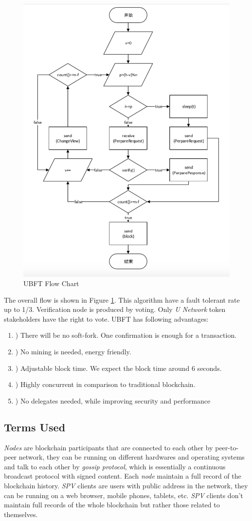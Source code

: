 \begin{figure}
\centering
\includegraphics[width= 0.7 \linewidth]{consensus.png}
\caption{UBFT Flow Chart}
\label{fig:ubft}
\end{figure}    
    
    The overall flow is shown in Figure \ref{fig:ubft}. This algorithm have a fault tolerant rate up to 1/3. Verification node is produced by voting. Only \emph{U Network} token stakeholders have the right to vote.  UBFT has following advantages:
\begin{enumerate}
    \item ) There will be no soft-fork. One confirmation is enough for a transaction. 
    \item ) No mining is needed, energy friendly.
    \item ) Adjustable block time. We expect the block time around 6 seconds. 
    \item ) Highly concurrent in comparison to traditional blockchain. 
    \item ) No delegates needed, while improving security and performance
\end{enumerate}



\subsection{Terms Used}
    \textit{Nodes} are blockchain participants that are connected to each other by peer-to-peer network, they can be running on different hardwares and operating systems and talk to each other by \textit{gossip protocol}, which is essentially a continuous broadcast protocol with signed content. Each \textit{node} maintain a full record of the blockchain history. \textit{SPV} clients are users with public address in the network, they can be running on a web browser, mobile phones, tablets, etc. \textit{SPV} clients don't maintain full records of the whole blockchain but rather those related to themselves.


